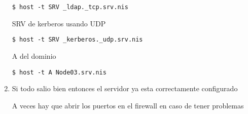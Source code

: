 \documentclass[../main.tex]{subfiles}
\begin{document}
\begin{enumerate}
    		\begin{listing}[H]
\begin{verbatim}
$ host -t SRV _ldap._tcp.srv.nis
\end{verbatim}
\end{listing}

        SRV de kerberos usando UDP


        \begin{listing}[H]
\begin{verbatim}
$ host -t SRV _kerberos._udp.srv.nis
\end{verbatim}
\end{listing}

        A del dominio

        \begin{listing}[H]
\begin{verbatim}
$ host -t A Node03.srv.nis
\end{verbatim}
\end{listing}

  \item Si todo salio bien entonces el servidor ya esta correctamente configurado

        A veces hay que abrir los puertos en el firewall en caso de tener problemas





\end{enumerate}
\end{document}
